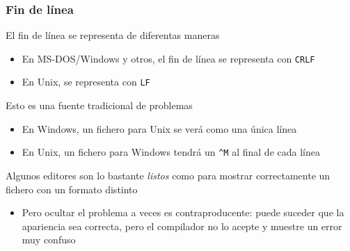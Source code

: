 \documentclass[ucs]{beamer}
\begin{document}
\begin{frame}[fragile]
\frametitle{Fin de línea}
El fin de línea se representa de diferentas maneras
\begin{itemize}
\item
En MS-DOS/Windows y otros,
el fin de línea se representa con \verb|CRLF|
\item
En Unix, se representa con \verb|LF|
\end{itemize}

Esto es una fuente tradicional de problemas
\begin{itemize}
\item
En Windows, un fichero para Unix se verá como una única línea
\item
En Unix, un fichero para Windows tendrá un \verb|^M| al final
de cada línea
\end{itemize}

Algunos editores son lo bastante \emph{listos} como para
mostrar correctamente un fichero con un formato distinto
\begin{itemize}
\item
Pero ocultar el problema a veces es contraproducente: puede
suceder que la apariencia sea correcta, pero el compilador
no lo acepte y muestre un error muy confuso
\end{itemize}

\end{frame}
\end{document}
